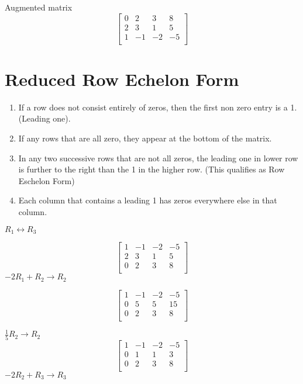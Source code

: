 Augmented matrix
\[	\begin{bmatrix}
	0 & 2 & 3 & 8 \\
	2 & 3 & 1 & 5 \\
	1 & -1 & -2 & -5 \\
\end{bmatrix}
\]

\section{Reduced Row Echelon Form}%
\label{sec:reduced_row_echelon_form}

\begin{enumerate}
	\item If a row does not consist entirely of zeros, then the first non zero entry is a 1. (Leading one).
	\item If any rows that are all zero, they appear at the bottom of the matrix.
	\item In any two successive rows that are not all zeros, the leading one in lower row is further to the right than
		the 1 in the higher row. (This qualifies as Row Eschelon Form)
	\item Each column that contains a leading 1 has zeros everywhere else in that column.
\end{enumerate}

\begin{solution}[1]

\end{solution}
$R_1\leftrightarrow R_3$

\[	\begin{bmatrix}
	1 & -1 & -2 & -5 \\
	2 & 3 & 1 & 5 \\
	0 & 2 & 3 & 8 \\
\end{bmatrix}
\]
$-2 R_1 + R_2 \to R_2$


\[	\begin{bmatrix}
	1 & -1 & -2 & -5 \\
	0 & 5 & 5 & 15 \\
	0 & 2 & 3 & 8 \\
\end{bmatrix}
\]

$\frac{1}{5}R_2 \to R_2$
\[	\begin{bmatrix}
	1 & -1 & -2 & -5 \\
	0 & 1 & 1 & 3 \\
	0 & 2 & 3 & 8 \\
\end{bmatrix}
\]
$-2 R_2 + R_3 \to R_3$

